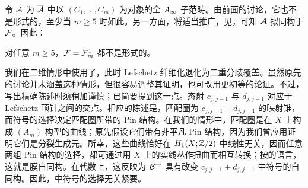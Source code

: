令 $\mathcal A$ 为 $\overline{\mathcal A}$ 中以 $(C_1,\ldots,C_m)$ 为对象的全 $A_\infty$ 子范畴。由前面的讨论，它也不是形式的，至少当 $m\ge5$ 时如此。另一方面，将适当推广，见，可知 $\mathcal A$ 拟同构于 $\mathcal F$。因此：
\begin{corollary}\label{st:20.4}
对任意 $m\ge5$，$\mathcal F=\mathcal F_m^1$ 都不是形式的。
\end{corollary}
\begin{note}\label{st:20.5}
我们在二维情形中使用了，此时 Lefschetz 纤维化退化为二重分歧覆盖。虽然原先的讨论并未涵盖这种情形，但很容易调整其证明，也可改用更初等的论证。不过，写出精确陈述时须稍加谨慎；已简要提到这一点。态射 $c_{j,j-1}$ 与 $d_{j,j-1}$ 对应于 Lefschetz 顶针之间的交点。相应的陈述是，匹配圈为 $c_{j,j-1}\pm d_{j,j-1}$ 的映射锥，而符号的选择决定匹配圈所带的 Pin 结构。在我们的情形中，匹配圈是在 $X$ 上构成 $(A_m)$ 构型的曲线；原先假设它们带有非平凡 Pin 结构，因为我们曾应用证明它们是分裂生成元。所幸，这些曲线恰好在
$H_1(X;\mathbb Z/2)$ 中线性无关，因而任意两组 Pin 结构的选择，都可通过用 $X$ 上的实线丛作扭曲而相互转换；按的语言，这就是膜自同构。在代数上，这反映为 $\mathcal B^\to$ 具有改变 $c_{j,j-1}\pm d_{j,j-1}$ 中符号的自同构。因此，中符号的选择无关紧要。
\end{note}
